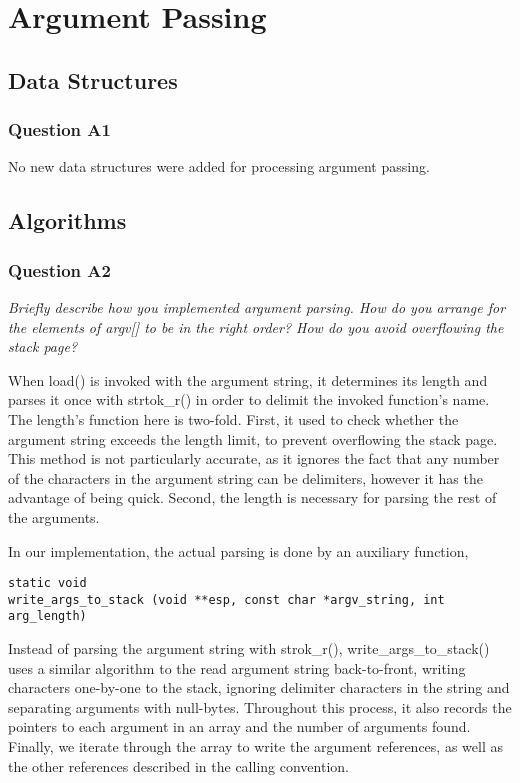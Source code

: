 \section{Argument Passing}
\subsection{Data Structures}
\subsubsection*{Question A1} %
No new data structures were added for processing argument passing.

\subsection{Algorithms}
\subsubsection*{Question A2} %
\textit{Briefly describe how you implemented argument parsing.  How do you arrange for the elements of argv[] to be in the right order? How do you avoid overflowing the stack page?}

When load() is invoked with the argument string, it determines its length and parses it once with strtok\_r() in order to delimit the invoked function's name.
The length's function here is two-fold.
First, it used to check whether the argument string exceeds the length limit, to prevent overflowing the stack page.
This method is not particularly accurate, as it ignores the fact that any number of the characters in the argument string can be delimiters, however it has the advantage of being quick.
Second, the length is necessary for parsing the rest of the arguments.

In our implementation, the actual parsing is done by an auxiliary function,
\begin{verbatim}
static void
write_args_to_stack (void **esp, const char *argv_string, int arg_length)
\end{verbatim}

Instead of parsing the argument string with strok\_r(), write\_args\_to\_stack() uses a similar algorithm to the read argument string back-to-front, writing characters one-by-one to the stack, ignoring delimiter characters in the string and separating arguments with null-bytes.
Throughout this process, it also records the pointers to each argument in an array and the number of arguments found.
Finally, we iterate through the array to write the argument references, as well as the other references described in the calling convention.

